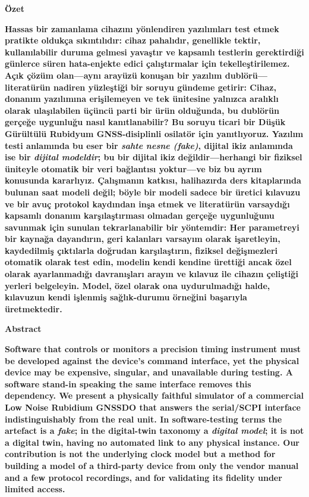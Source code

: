 \documentclass[9pt,twocolumn,a4paper]{extarticle}
\begin{document}
\begin{center}
    {\fontsize{10}{12}\selectfont\bfseries Özet \par}
\end{center}
\vspace{-10pt}
\noindent \textbf{Hassas bir zamanlama cihazını yönlendiren yazılımları test etmek pratikte oldukça sıkıntılıdır: cihaz pahalıdır, genellikle tektir, kullanılabilir duruma gelmesi yavaştır ve kapsamlı testlerin gerektirdiği günlerce süren hata-enjekte edici çalıştırmalar için tekelleştirilemez. Açık çözüm olan---aynı arayüzü konuşan bir yazılım dublörü---literatürün nadiren yüzleştiği bir soruyu gündeme getirir: Cihaz, donanım yazılımına erişilemeyen ve tek ünitesine yalnızca aralıklı olarak ulaşılabilen üçüncü parti bir ürün olduğunda, bu dublörün gerçeğe uygunluğu nasıl kanıtlanabilir? Bu soruyu ticari bir Düşük Gürültülü Rubidyum GNSS-disiplinli osilatör için yanıtlıyoruz. Yazılım testi anlamında bu eser bir \textit{sahte nesne (fake)}, dijital ikiz anlamında ise bir \textit{dijital modeldir}; bu bir dijital ikiz değildir---herhangi bir fiziksel üniteyle otomatik bir veri bağlantısı yoktur---ve biz bu ayrım konusunda kararlıyız. Çalışmanın katkısı, halihazırda ders kitaplarında bulunan saat modeli değil; böyle bir modeli sadece bir üretici kılavuzu ve bir avuç protokol kaydından inşa etmek ve literatürün varsaydığı kapsamlı donanım karşılaştırması olmadan gerçeğe uygunluğunu savunmak için sunulan tekrarlanabilir bir yöntemdir: Her parametreyi bir kaynağa dayandırın, geri kalanları varsayım olarak işaretleyin, kaydedilmiş çıktılarla doğrudan karşılaştırın, fiziksel değişmezleri otomatik olarak test edin, modelin kendi kendine ürettiği ancak özel olarak ayarlanmadığı davranışları arayın ve kılavuz ile cihazın çeliştiği yerleri belgeleyin. Model, özel olarak ona uydurulmadığı halde, kılavuzun kendi işlenmiş sağlık-durumu örneğini başarıyla üretmektedir.}
\vspace{-7pt}

\begin{center}
    {\fontsize{10}{12}\selectfont\bfseries Abstract \par}
\end{center}
\vspace{-0.5em}
\noindent \textbf{Software that controls or monitors a precision timing instrument must be developed against the device's command interface, yet the physical device may be expensive, singular, and unavailable during testing. A software stand-in speaking the same interface removes this dependency. We present a physically faithful simulator of a commercial Low Noise Rubidium GNSSDO that answers the serial/SCPI interface indistinguishably from the real unit. In software-testing terms the artefact is a \textit{fake}; in the digital-twin taxonomy a \textit{digital model}; it is not a digital twin, having no automated link to any physical instance. Our contribution is not the underlying clock model but a method for building a model of a third-party device from only the vendor manual and a few protocol recordings, and for validating its fidelity under limited access.}
\end{document}

